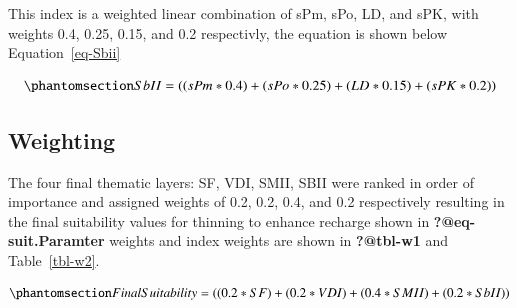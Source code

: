 \documentclass[
  number,
  preprint,
  3p,
  onecolumn]{elsarticle}
\begin{document}
This index is a weighted linear combination of sPm, sPo, LD, and sPK,
with weights 0.4, 0.25, 0.15, and 0.2 respectivly, the equation is shown
below Equation~\ref{eq-Sbii}

\begin{equation}\phantomsection\label{eq-Sbii}{
SbII = ((sPm * 0.4) + (sPo * 0.25) + (LD * 0.15) + (sPK * 0.2))
}\end{equation}

\subsection{Weighting}\label{weighting}

The four final thematic layers: SF, VDI, SMII, SBII were ranked in order
of importance and assigned weights of 0.2, 0.2, 0.4, and 0.2
respectively resulting in the final suitability values for thinning to
enhance recharge shown in \textbf{?@eq-suit.Paramter} weights and index
weights are shown in \textbf{?@tbl-w1} and Table~\ref{tbl-w2}.

\begin{equation}\phantomsection\label{eq-suit}{
Final Suitability = ((0.2 * SF) + (0.2 * VDI) + (0.4 * SMII) + (0.2 * SbII)) }\end{equation}
\end{document}
